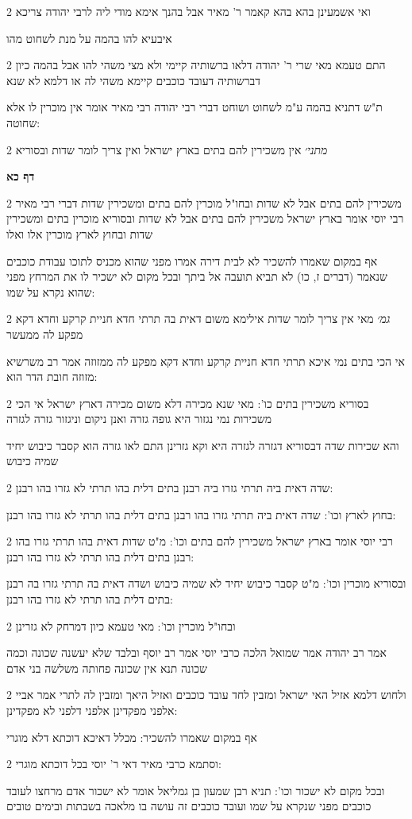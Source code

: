 \documentclass[12pt, openany]{book}
\newcommand{\sethebfont}{
\fontsize{10.5pt}{21.0pt} \selectfont
}
\newcommand{\twocol}[1]{
	{\sethebfont \begin{multicols}{2}
			#1
	\end{multicols}}	
}
\newcommand{\sectname}{}
\newcommand{\newsection}[1]{
	\addcontentsline{toc}{section}{#1}
	\renewcommand{\sectname}{#1}	
	\vspace{-\baselineskip}
	\begin{center}
		\textbf{%
\fontsize{16pt}{16pt}\selectfont
			#1}
	\end{center}
	\vspace{-\baselineskip}
	\nopagebreak
}
\begin{document}
\twocol{ואי אשמעינן בהא בהא קאמר ר' מאיר אבל בהנך אימא מודי ליה לרבי יהודה צריכא
\par  איבעיא להו בהמה על מנת לשחוט מהו}
\twocol{התם טעמא מאי שרי ר' יהודה דלאו ברשותיה קיימי ולא מצי משהי להו אבל בהמה כיון דברשותיה דעובד כוכבים קיימא משהי לה או דלמא לא שנא
\par ת"ש דתניא בהמה ע"מ לשחוט ושוחט דברי רבי יהודה רבי מאיר אומר אין מוכרין לו אלא שחוטה:}
\twocol{{\large\emph{מתני׳}} אין משכירין להם בתים בארץ ישראל ואין צריך לומר שדות ובסוריא}
\newsection{דף כא}
\twocol{משכירין להם בתים אבל לא שדות ובחו"ל מוכרין להם בתים ומשכירין שדות דברי רבי מאיר רבי יוסי אומר בארץ ישראל משכירין להם בתים אבל לא שדות ובסוריא מוכרין בתים ומשכירין שדות ובחוץ לארץ מוכרין אלו ואלו
\par אף במקום שאמרו להשכיר לא לבית דירה אמרו מפני שהוא מכניס לתוכו עבודת כוכבים שנאמר (דברים ז, כו) לא תביא תועבה אל ביתך ובכל מקום לא ישכיר לו את המרחץ מפני שהוא נקרא על שמו:}
\twocol{{\large\emph{גמ׳}} מאי אין צריך לומר שדות אילימא משום דאית בה תרתי חדא חניית קרקע וחדא דקא מפקע לה ממעשר
\par אי הכי בתים נמי איכא תרתי חדא חניית קרקע וחדא דקא מפקע לה ממזוזה אמר רב משרשיא מזוזה חובת הדר הוא:}
\twocol{בסוריא משכירין בתים כו': מאי שנא מכירה דלא משום מכירה דארץ ישראל אי הכי משכירות נמי נגזור היא גופה גזרה ואנן ניקום וניגזור גזרה לגזרה
\par והא שכירות שדה דבסוריא דגזרה לגזרה היא וקא גזרינן התם לאו גזרה הוא קסבר כיבוש יחיד שמיה כיבוש}
\twocol{שדה דאית ביה תרתי גזרו ביה רבנן בתים דלית בהו תרתי לא גזרו בהו רבנן:
\par בחוץ לארץ וכו': שדה דאית ביה תרתי גזרו בהו רבנן בתים דלית בהו תרתי לא גזרו בהו רבנן:}
\twocol{רבי יוסי אומר בארץ ישראל משכירין להם בתים וכו': מ"ט שדות דאית בהו תרתי גזרו בהו רבנן בתים דלית בהו תרתי לא גזרו בהו רבנן:
\par ובסוריא מוכרין וכו': מ"ט קסבר כיבוש יחיד לא שמיה כיבוש ושדה דאית בה תרתי גזרו בה רבנן בתים דלית בהו תרתי לא גזרו בהו רבנן:}
\twocol{ובחו"ל מוכרין וכו': מאי טעמא כיון דמרחק לא גזרינן
\par אמר רב יהודה אמר שמואל הלכה כרבי יוסי אמר רב יוסף ובלבד שלא יעשנה שכונה וכמה שכונה תנא אין שכונה פחותה משלשה בני אדם}
\twocol{ולחוש דלמא אזיל האי ישראל ומזבין לחד עובד כוכבים ואזיל היאך ומזבין לה לתרי אמר אביי אלפני מפקדינן אלפני דלפני לא מפקדינן:
\par אף במקום שאמרו להשכיר: מכלל דאיכא דוכתא דלא מוגרי}
\twocol{וסתמא כרבי מאיר דאי ר' יוסי בכל דוכתא מוגרי:
\par ובכל מקום לא ישכור וכו': תניא רבן שמעון בן גמליאל אומר לא ישכור אדם מרחצו לעובד כוכבים מפני שנקרא על שמו ועובד כוכבים זה עושה בו מלאכה בשבתות ובימים טובים}
\end{document}
